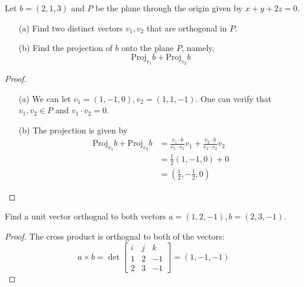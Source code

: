 \documentclass[openany]{book}
\begin{document}
\begin{prob}
    Let $b=(2,1,3)$ and $P$ be the plane through the origin given by $x+y+2z=0$. 
    \begin{enumerate}
        \item[(a)] Find two distinct vectors $v_1,v_2$ that are orthogonal in $P$.
        \item[(b)] Find the projection of $b$ onto the plane $P$, namely, 
        \begin{equation*}
            \text{Proj}_{v_1}b+\text{Proj}_{v_2}b
        \end{equation*}
    \end{enumerate}
\end{prob}
\begin{proof}
    \begin{enumerate}
        \item[(a)] We can let $v_1=(1,-1,0), v_2=(1,1,-1)$. One can verify that $v_1,v_2\in P$ and $v_1\cdot v_2=0$.
        \item[(b)] The projection is given by
        \begin{align*}
            \text{Proj}_{v_1}b+\text{Proj}_{v_2}b&=\frac{v_1\cdot b}{v_1\cdot v_1}v_1+\frac{v_2\cdot b}{v_2\cdot v_2}v_2\\
            &=\frac{1}{2}(1,-1,0)+0\\
            &=\left(\frac{1}{2}, -\frac{1}{2},0\right)
        \end{align*}
    \end{enumerate}
\end{proof}


\begin{prob}
    Find a unit vector orthognal to both vectors $a=(1,2,-1), b=(2,3,-1)$.
\end{prob}
\begin{proof}
    The cross product is orthognal to both of the vectors:
    \begin{equation*}
        a\times b=\det\begin{bmatrix}
            i&j&k\\
            1&2&-1\\
            2&3&-1
        \end{bmatrix}=(1,-1, -1)
    \end{equation*}
\end{proof}
\end{document}
